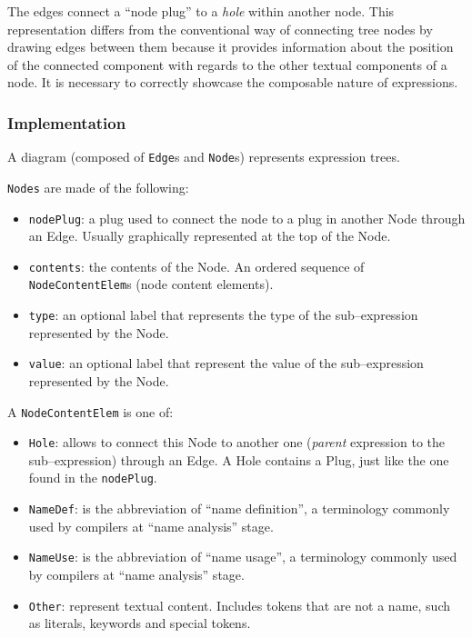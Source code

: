 \begin{chapterBody}
The edges connect a ``node plug'' to a \textit{hole} within another node. This
representation differs from the conventional way of connecting tree nodes by
drawing edges between them because it provides information about the position 
of the connected component with regards to the other textual components of a
node. It is necessary to correctly showcase the composable nature of
expressions.

\subsubsection*{Implementation}

A diagram (composed of \texttt{Edge}s and \texttt{Node}s) represents
expression trees. 

\texttt{Nodes} are made of the following:

\begin{itemize}
    \item \texttt{nodePlug}: a plug used to connect the node to a plug in
another Node through an Edge. Usually graphically represented at the top of
the Node.
    \item \texttt{contents}: the contents of the Node. An ordered sequence of
\texttt{NodeContentElem}s (node content elements).
    \item \texttt{type}: an optional label that represents the type of the
sub–expression represented by the Node.
    \item \texttt{value}: an optional label that represent the value of the
sub–expression represented by the Node.
\end{itemize}

A \texttt{NodeContentElem} is one of:

\begin{itemize}
    \item \texttt{Hole}: allows to connect this Node to another one
(\textit{parent} expression to the sub–expression) through an Edge.
A Hole contains a Plug, just like the one found in the \texttt{nodePlug}.
    \item \texttt{NameDef}: is the abbreviation of ``name definition'', a
terminology commonly used by compilers at ``name analysis'' stage.
    \item \texttt{NameUse}: is the abbreviation of ``name usage'', a
terminology commonly used by compilers at ``name analysis'' stage.
    \item \texttt{Other}: represent textual content. Includes tokens
that are not a name, such as literals, keywords and special tokens. 
\end{itemize}


\end{chapterBody}
